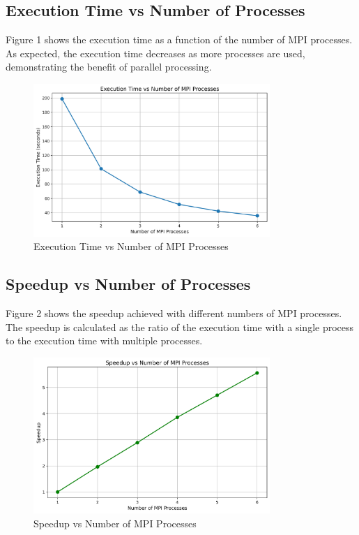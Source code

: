 \documentclass{article}
\begin{document}
\subsection{Execution Time vs Number of Processes}
Figure 1 shows the execution time as a function of the number of MPI processes. As expected, the execution time decreases as more processes are used, demonstrating the benefit of parallel processing.

\begin{figure}[H]
\centering
\includegraphics[width=0.8\textwidth]{time_vs_processes.png}
\caption{Execution Time vs Number of MPI Processes}
\end{figure}

\subsection{Speedup vs Number of Processes}
Figure 2 shows the speedup achieved with different numbers of MPI processes. The speedup is calculated as the ratio of the execution time with a single process to the execution time with multiple processes.

\begin{figure}[H]
\centering
\includegraphics[width=0.8\textwidth]{speedup_vs_processes.png}
\caption{Speedup vs Number of MPI Processes}
\end{figure}
\end{document}

